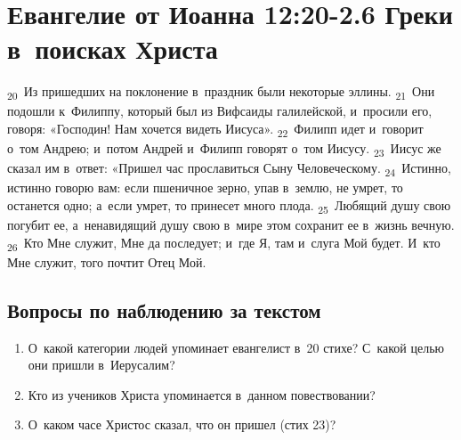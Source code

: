 \documentclass[a4paper,12pt]{article}
\begin{document}

\section{Евангелие от Иоанна 12:20-2.6 Греки в~поисках Христа}

\textsubscript{20}~Из пришедших на поклонение в~праздник были некоторые эллины. \textsubscript{21}~Они подошли к~Филиппу, который был из Вифсаиды галилейской, и~просили его, говоря: «Господин! Нам хочется видеть Иисуса». \textsubscript{22}~Филипп идет и~говорит о~том Андрею; и~потом Андрей и~Филипп говорят о~том Иисусу. \textsubscript{23}~Иисус же сказал им в~ответ: «Пришел час прославиться Сыну Человеческому. \textsubscript{24}~Истинно, истинно говорю вам: если пшеничное зерно, упав в~землю, не умрет, то останется одно; а~если умрет, то принесет много плода. \textsubscript{25}~Любящий душу свою погубит ее, а~ненавидящий душу свою в~мире этом сохранит ее в~жизнь вечную. \textsubscript{26}~Кто Мне служит, Мне да последует; и~где Я, там и~слуга Мой будет. И~кто Мне служит, того почтит Отец Мой.

\subsection*{Вопросы по наблюдению за текстом}
\begin{enumerate}
    \item О~какой категории людей упоминает евангелист в~20 стихе? С~какой целью они пришли в~Иерусалим? 
    
    \myline
    
    \myline
    \item Кто из учеников Христа упоминается в~данном повествовании? 
    
    \myline
    
    \myline
    \item О~каком часе Христос сказал, что он пришел (стих 23)? 
    
    \myline
    
    \myline
\end{enumerate}
\end{document}
